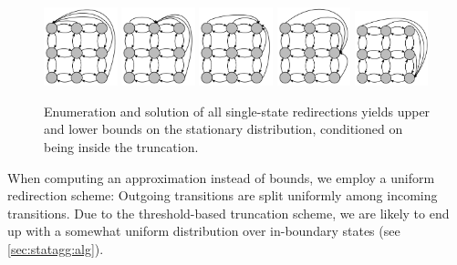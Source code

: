 \begin{figure}[htb]
    \centering
    \includegraphics[width=0.19\textwidth]{gfx/state_space_redirected_1.pdf}
    \includegraphics[width=0.19\textwidth]{gfx/state_space_redirected_2.pdf}
    \includegraphics[width=0.19\textwidth]{gfx/state_space_redirected_3.pdf}
    \includegraphics[width=0.19\textwidth]{gfx/state_space_redirected_4.pdf}
    \includegraphics[width=0.19\textwidth]{gfx/state_space_redirected_5.pdf}
    \caption[Redirections for bounds]{Enumeration and solution of all single-state
    redirections yields upper and lower bounds on the stationary
    distribution, conditioned on being inside the truncation.\label{fig:fsp_redirections}}
\end{figure}

When computing an approximation instead of bounds, we employ a uniform redirection scheme:
Outgoing transitions are split uniformly among incoming transitions.
Due to the threshold-based truncation scheme, we are likely to end up with a somewhat uniform distribution over in-boundary states (see \autoref{sec:statagg:alg}).


